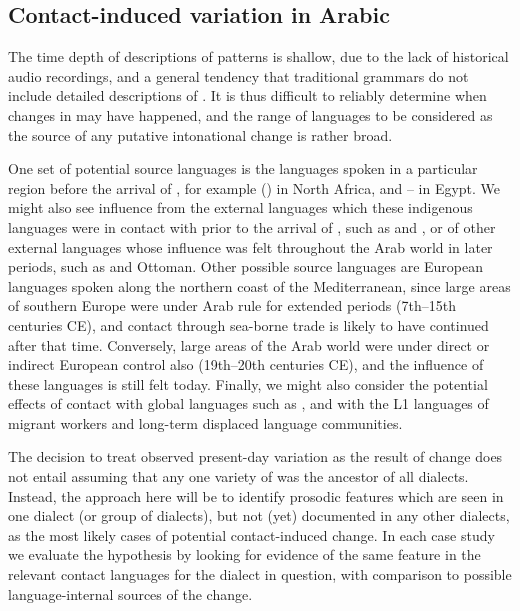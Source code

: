 \documentclass[output=paper]{langsci/langscibook}
\begin{document}
 
 \subsection{Contact-induced variation in Arabic} \label{aravar}


The time depth of descriptions of  patterns is shallow, due to the lack of historical audio recordings, and a general tendency that traditional grammars do not include detailed descriptions of . It is thus difficult to reliably determine when changes in  may have happened, and the range of languages to be considered as the source of any putative intonational change is rather broad. 

One set of potential source languages is the  languages spoken in a particular region before the arrival of , for example  () in North Africa, and -- in Egypt. We might also see influence from the external languages which these indigenous languages were in contact with prior to the arrival of , such as  and , or of other external languages whose influence was felt throughout the Arab world in later periods, such as  and Ottoman. Other possible source languages are European languages spoken along the northern coast of the Mediterranean, since large areas of southern Europe were under Arab rule for extended periods (7th--15th centuries CE), and contact through sea-borne trade is likely to have continued after that time. Conversely, large areas of the Arab world were under direct or indirect European control also (19th--20th centuries CE), and the influence of these languages is still felt today. Finally, we might also consider the potential effects of contact with global languages such as , and with the L1 languages of migrant workers and long-term displaced language communities.

The decision to treat observed present-day variation as the result of change does not entail assuming that any one variety of  was the ancestor of all dialects. Instead, the approach here will be to identify prosodic features which are seen in one  dialect (or group of dialects), but not (yet) documented in any other dialects, as the most likely cases of potential contact-induced change. In each case study we evaluate the hypothesis by looking for evidence of the same feature in the relevant contact languages for the dialect in question, with comparison to possible language-internal sources of the change. 
\end{document}
